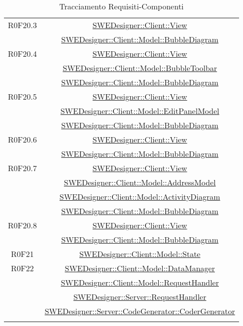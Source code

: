\documentclass[../SpecificaTecnica.tex]{subfiles}
\begin{document}
\begin{longtable}{|c|c|}
		R0F20.3 & \hyperlink{SWEDesigner::Client::View}{SWEDesigner::Client::View} \\& \hyperlink{SWEDesigner::Client::Model::BubbleDiagram}{SWEDesigner::Client::Model::BubbleDiagram}\\\hline
		R0F20.4 & \hyperlink{SWEDesigner::Client::View}{SWEDesigner::Client::View} \\& \hyperlink{SWEDesigner::Client::Model::BubbleToolbar}{SWEDesigner::Client::Model::BubbleToolbar} \\& \hyperlink{SWEDesigner::Client::Model::BubbleDiagram}{SWEDesigner::Client::Model::BubbleDiagram} \\\hline
		R0F20.5 & \hyperlink{SWEDesigner::Client::View}{SWEDesigner::Client::View} \\& \hyperlink{SWEDesigner::Client::Model::EditPanelModel}{SWEDesigner::Client::Model::EditPanelModel} \\& \hyperlink{SWEDesigner::Client::Model::BubbleDiagram}{SWEDesigner::Client::Model::BubbleDiagram}\\\hline
		R0F20.6 & \hyperlink{SWEDesigner::Client::View}{SWEDesigner::Client::View} \\& \hyperlink{SWEDesigner::Client::Model::BubbleDiagram}{SWEDesigner::Client::Model::BubbleDiagram}\\\hline
		R0F20.7 & \hyperlink{SWEDesigner::Client::View}{SWEDesigner::Client::View} \\& \hyperlink{SWEDesigner::Client::Model::AddressModel}{SWEDesigner::Client::Model::AddressModel} \\& \hyperlink{SWEDesigner::Client::Model::ActivityDiagram}{SWEDesigner::Client::Model::ActivityDiagram} \\& \hyperlink{SWEDesigner::Client::Model::BubbleDiagram}{SWEDesigner::Client::Model::BubbleDiagram}\\\hline
		R0F20.8 & \hyperlink{SWEDesigner::Client::View}{SWEDesigner::Client::View} \\& \hyperlink{SWEDesigner::Client::Model::BubbleDiagram}{SWEDesigner::Client::Model::BubbleDiagram}\\\hline
		R0F21 & \hyperlink{SWEDesigner::Client::Model::State}{SWEDesigner::Client::Model::State}\\\hline
		R0F22 & \hyperlink{SWEDesigner::Client::Model::DataManager}{SWEDesigner::Client::Model::DataManager} \\& \hyperlink{SWEDesigner::Client::Model::RequestHandler}{SWEDesigner::Client::Model::RequestHandler} \\& \hyperlink{SWEDesigner::Server::RequestHandler}{SWEDesigner::Server::RequestHandler} \\& \hyperlink{SWEDesigner::Server::CodeGenerator::CoderGenerator}{SWEDesigner::Server::CodeGenerator::CoderGenerator} \\\hline
		\caption[Tracciamento Requisiti-Componenti]{Tracciamento Requisiti-Componenti}
		\label{tabella:requisiti-componenti}
	\end{longtable}
	\clearpage
	
\end{document}
